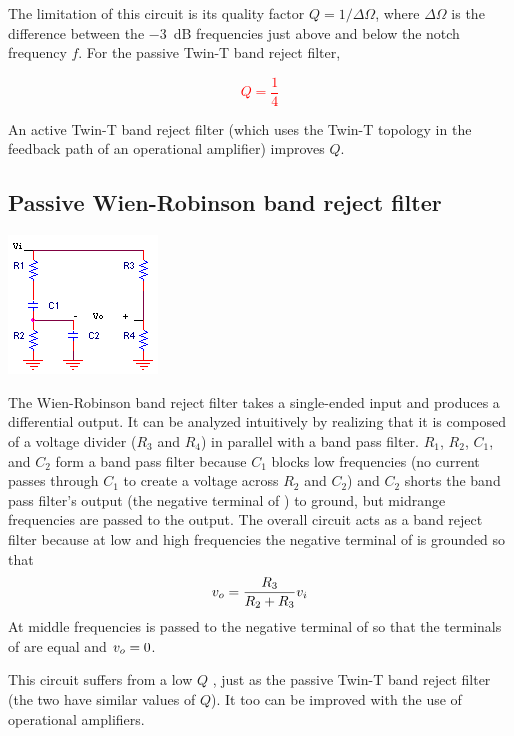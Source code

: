 The limitation of this circuit is its quality factor $Q = 1/\Delta\Omega$, where $\Delta\Omega$ is the difference between the \SI{-3}{\dB} frequencies just above and below the notch frequency $f$.
For the passive Twin-T band reject filter,

\textcolor{red}{
\begin{equation}
Q = \frac{1}{4}
\label{passiveTwinT_Q}
\end{equation}
}

An active Twin-T band reject filter (which uses the Twin-T topology in the feedback path of an operational amplifier) improves $Q$. \autocite[321]{op-amps-for-everyone}

\subsection{Passive Wien-Robinson band reject filter}
\begin{center}
	\includegraphics{schematics/passiveWien-Robinsonbandrejectfilter.PNG}
\end{center}
The Wien-Robinson band reject filter takes a single-ended input and produces a differential output.
It can be analyzed intuitively by realizing that it is composed of a voltage divider ($R_3$ and $R_4$) in parallel with a band pass filter.
$R_1$, $R_2$, $C_1$, and $C_2$ form a band pass filter because $C_1$ blocks low frequencies (no current passes through $C_1$ to create a voltage across $R_2$ and $C_2$) and $C_2$ shorts the band pass filter's output (the negative terminal of \vout) to ground, but midrange frequencies are passed to the output.
The overall circuit acts as a band reject filter because at low and high frequencies the negative terminal of \vout is grounded so that \[\vout = \frac{R_{3}}{R_{2}+R_{3}}v_{i}\]
At middle frequencies \vin is passed to the negative terminal of \vout so that the terminals of \vout are equal and $\vout = 0$.

This circuit suffers from a low $Q$ \autocite[323]{op-amps-for-everyone}, just as the passive Twin-T band reject filter (the two have similar values of $Q$).
It too can be improved with the use of operational amplifiers.


